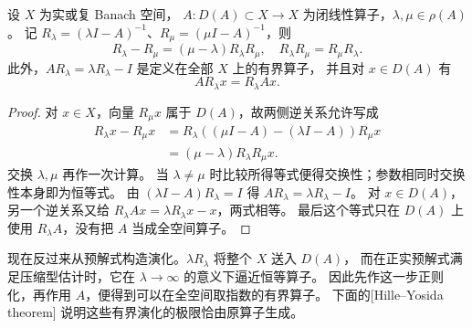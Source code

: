 \begin{lemma}[预解式恒等式]\label{b2:lem:D-resolvent-identity}
设 \(X\) 为实或复 Banach 空间，
\(A:D(A)\subset X\to X\) 为闭线性算子，\(\lambda,\mu\in\rho(A)\)。
记 \(R_\lambda=(\lambda I-A)^{-1}\)、\(R_\mu=(\mu I-A)^{-1}\)，则
\[
 R_\lambda-R_\mu=(\mu-\lambda)R_\lambda R_\mu,
 \quad
 R_\lambda R_\mu=R_\mu R_\lambda.
\]
此外，\(AR_\lambda=\lambda R_\lambda-I\) 是定义在全部 \(X\) 上的有界算子，
并且对 \(x\in D(A)\) 有
\[
 AR_\lambda x=R_\lambda Ax.
\]
\end{lemma}
\begin{proof}
对 \(x\in X\)，向量 \(R_\mu x\) 属于 \(D(A)\)，故两侧逆关系允许写成
\[
 \begin{aligned}
 R_\lambda x-R_\mu x
 &=R_\lambda
   \left((\mu I-A)-(\lambda I-A)\right)R_\mu x\\
 &=(\mu-\lambda)R_\lambda R_\mu x.
 \end{aligned}
\]
交换 \(\lambda,\mu\) 再作一次计算。
当 \(\lambda\ne\mu\) 时比较所得等式便得交换性；参数相同时交换性本身即为恒等式。
由 \((\lambda I-A)R_\lambda=I\) 得
\(AR_\lambda=\lambda R_\lambda-I\)。
对 \(x\in D(A)\)，另一个逆关系又给
\(R_\lambda Ax=\lambda R_\lambda x-x\)，两式相等。
最后这个等式只在 \(D(A)\) 上使用 \(R_\lambda A\)，没有把 \(A\) 当成全空间算子。
\end{proof}

\ProseParagraphBreak
现在反过来从预解式构造演化。\(\lambda R_\lambda\) 将整个 \(X\) 送入 \(D(A)\)，
而在正实预解式满足压缩型估计时，它在 \(\lambda\to\infty\) 的意义下逼近恒等算子。
因此先作这一步正则化，再作用 \(A\)，便得到可以在全空间取指数的有界算子。
下面的[Hille--Yosida theorem]
说明这些有界演化的极限恰由原算子生成。

